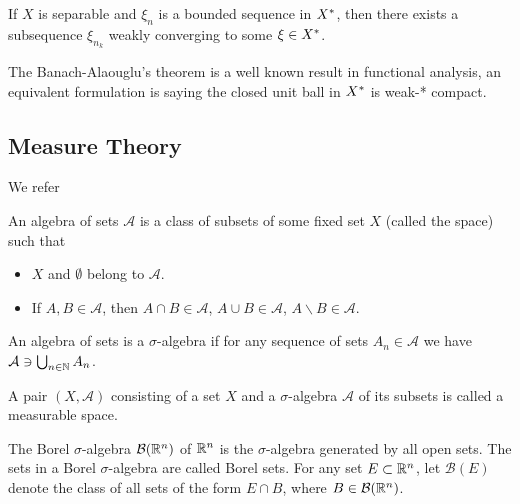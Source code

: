\begin{theorem}
	If $X$ is separable and $\xi_n$ is a bounded sequence in ${X}^*$, then there exists a subsequence $\xi_{n_k}$ weakly converging to some $\xi \in {X}^*$.
\end{theorem}

The Banach-Alaouglu's theorem is a well known result in functional analysis, an equivalent formulation is saying the closed unit ball in ${X}^*$ is weak-* compact.

\subsection{Measure Theory}

We refer \cite{bogachev2007Measure}
\begin{definition}
	
	An algebra of sets $\mathcal{A}$ is a class of subsets of some fixed set $X$ (called the space) such that
	
	\begin{itemize}
		\item $X$ and $\emptyset$ belong to $\mathcal{A}$.
		\item If $A, B \in \mathcal{A}$, then $A\cap B \in \mathcal{A}$, $A\cup B \in \mathcal A$, $A\backslash B \in \mathcal A$.
	\end{itemize}
	
	An algebra of sets is a $\sigma$-algebra if for any sequence of sets $A_n \in \mathcal A$ we have $\mathcal{A}\ni \bigcup_{n\in \mathbb{N}}  A_n $.
\end{definition}

\begin{definition} 
	A pair $(X, \mathcal A)$ consisting of a set $X$ and a $\sigma$-algebra $\mathcal A$ of its subsets is called a measurable space.
\end{definition}

\begin{definition}
	The Borel $\sigma$-algebra $\mathcal{B}(\mathbb{R}^n)$ of $\mathbb{R}^n$ is the $\sigma$-algebra generated by all open sets. The sets in a Borel $\sigma$-algebra are called Borel sets. For any set $E\subset \mathbb{R}^n$, let $\mathcal B(E)$ denote the class of all sets of the form $E\cap B$, where $B\in\mathcal B(\mathbb{R}^n)$.
\end{definition}

